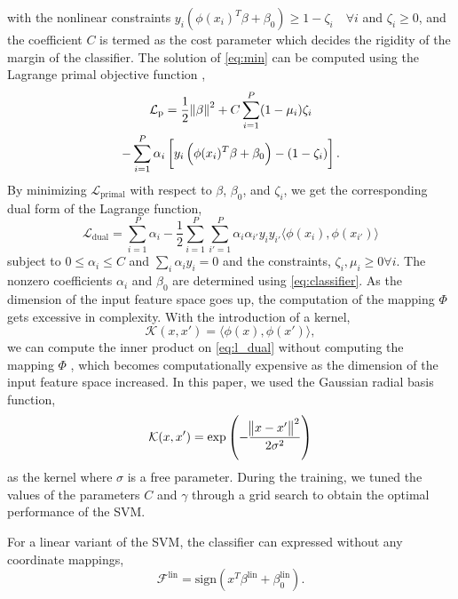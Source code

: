 \documentclass[journal,comsoc]{IEEEtran}
\renewcommand{\^}{\hat}  %
\begin{document}
%
with the nonlinear constraints $y_i (\phi(x_i)^T \beta + \beta_0) \ge 1 - \zeta_i \quad \forall i $ and $ \zeta_i \ge 0$, and the coefficient $C$ is termed as the cost parameter which decides the rigidity of the margin of the classifier. The solution of \eqref{eq:min} can be computed using the Lagrange primal objective function \cite{friedman2001elements},
%
\begin{multline}
  \mathcal L_{\mathrm{p}} = \dfrac{1}{2} \norm{\beta}^2 + C \sum \limits_{i =1}^{P} (1 - \mu_i)\zeta_i \\
  - \sum \limits_{i =1}^{P} \alpha_i \left[ y_i \left( \phi(x_i)^T \beta + \beta_0 \right) - (1 - \zeta_i) \right].
  \label{eq:l_primal}
\end{multline}
%
By minimizing $\mathcal L_{\mathrm{primal}}$ with respect to $\beta$, $\beta_0$, and $\zeta_i$, we get the corresponding dual form of the Lagrange function,
%
\begin{equation}
  \mathcal L_{\mathrm{dual}} = \sum \limits_{i = 1}^{P} \alpha_i - \frac{1}{2} \sum \limits_{i = 1}^{P} \sum_{i' = 1}^{P} \alpha_i \alpha_{i'} y_i y_{i'} \langle \phi(x_i), \phi(x_{i'}) \rangle
  \label{eq:l_dual}
\end{equation}
%
subject to $0 \le \alpha_i \le C$ and $\sum_{i} \alpha_i y_i = 0$ and the constraints, $\zeta_i, \mu_i \ge 0 \forall i$. The nonzero coefficients $\alpha_i$ and $\beta_0$ are determined using \eqref{eq:classifier}. As the dimension of the input feature space goes up, the computation of the mapping $\Phi$ gets excessive in complexity. With the introduction of a kernel,
%
\begin{equation}
  \mathcal K(x,x') = \langle \phi(x), \phi(x') \rangle,
  \label{eq:kernel}
\end{equation}
%
we can compute the inner product on \eqref{eq:l_dual} without  computing the mapping $\Phi$ \cite{scholkopf2002learning}, which becomes computationally expensive as the dimension of the input feature space increased. In this paper, we used the Gaussian radial basis function,
%
\begin{equation}
  \mathcal K(x,x') = \exp {\left(- \frac{\norm{x -x'}^2}{2\sigma^2}\right)}
  \label{eq:rbf}
\end{equation}
%
as the kernel where $\sigma$ is a free parameter. During the training, we tuned the values of the parameters $C$ and $\gamma$ through a grid search to obtain the optimal performance of the SVM.

For a linear variant of the SVM, the classifier can expressed without any coordinate mappings,
%
\begin{equation}
  \mathcal F^{\mathrm{lin}} = \mathrm{sign} \left( x^T \beta^{\mathrm{lin}} + \beta^{\mathrm{lin}}_0 \right).
  \label{eq:lin_classifier}
\end{equation}
%
\end{document}
